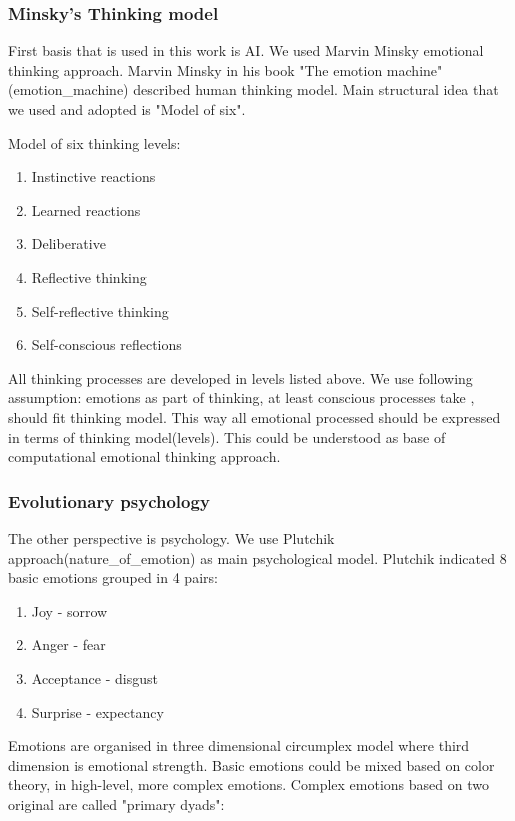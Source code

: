 \subsubsection{Minsky's Thinking model}

First basis that is used in this work is  AI. We used Marvin Minsky emotional thinking approach.
Marvin Minsky in his book "The emotion machine" (emotion_machine) described human thinking model. Main structural idea that we used and adopted is "Model of six".

Model of six thinking levels:

\begin{enumerate}
\item  Instinctive reactions
\item  Learned reactions
\item  Deliberative
\item  Reflective thinking
\item  Self-reflective thinking
\item  Self-conscious reflections
\end{enumerate}

All thinking processes are developed in levels listed above. We use following assumption: emotions as part of thinking, at least conscious processes take , should fit thinking model. This way all emotional processed should be expressed in terms of thinking model(levels). This could be understood as base of computational emotional thinking approach.

\subsubsection{Evolutionary psychology}

The other perspective is psychology.  We use Plutchik approach(nature_of_emotion) as main psychological model. Plutchik indicated 8 basic emotions grouped in 4 pairs:

\begin{enumerate}
\item  Joy - sorrow
\item  Anger - fear
\item  Acceptance - disgust
\item  Surprise - expectancy
\end{enumerate}

Emotions are organised in three dimensional circumplex model where third dimension is emotional strength. Basic emotions could be mixed based on color theory, in high-level, more complex emotions. Complex emotions based on two original are called "primary dyads":

